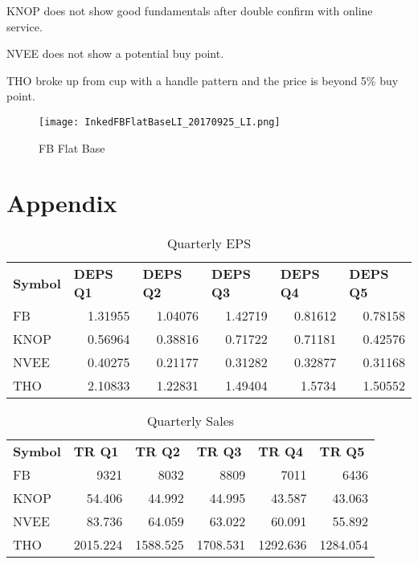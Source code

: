 \documentclass{article}
\begin{document}
KNOP does not show good fundamentals after double confirm with online service.

NVEE does not show a potential buy point. 

THO broke up from cup with a handle pattern and the price is beyond 5\% buy point.

\begin{figure}[h]
\centering
\texttt{[image: InkedFBFlatBaseLI\_20170925\_LI.png]}
\caption{FB Flat Base}
\label{fig:FBFlatBase}
\end{figure}

\section{Appendix}
\begin{table}[htbp]
  \caption{Quarterly EPS}
    \begin{tabular}{lrrrrr}
    \textbf{Symbol} & \multicolumn{1}{l}{\textbf{DEPS Q1}} & \multicolumn{1}{l}{\textbf{DEPS Q2}} & \multicolumn{1}{l}{\textbf{DEPS Q3}} & \multicolumn{1}{l}{\textbf{DEPS Q4}} & \multicolumn{1}{l}{\textbf{DEPS Q5}} \\
    FB    & 1.31955 & 1.04076 & 1.42719 & 0.81612 & 0.78158 \\
    KNOP  & 0.56964 & 0.38816 & 0.71722 & 0.71181 & 0.42576 \\
    NVEE  & 0.40275 & 0.21177 & 0.31282 & 0.32877 & 0.31168 \\
    THO   & 2.10833 & 1.22831 & 1.49404 & 1.5734 & 1.50552 \\
    \end{tabular}%
  \label{tab:addlabel}%
\end{table}%

\begin{table}[htbp]
  \caption{Quarterly Sales}
    \begin{tabular}{lrrrrr}
    \textbf{Symbol} & \multicolumn{1}{l}{\textbf{TR Q1}} & \multicolumn{1}{l}{\textbf{TR Q2}} & \multicolumn{1}{l}{\textbf{TR Q3}} & \multicolumn{1}{l}{\textbf{TR Q4}} & \multicolumn{1}{l}{\textbf{TR Q5}} \\
    FB    & 9321  & 8032  & 8809  & 7011  & 6436 \\
    KNOP  & 54.406 & 44.992 & 44.995 & 43.587 & 43.063 \\
    NVEE  & 83.736 & 64.059 & 63.022 & 60.091 & 55.892 \\
    THO   & 2015.224 & 1588.525 & 1708.531 & 1292.636 & 1284.054 \\
    \end{tabular}%
  \label{tab:addlabel}%
\end{table}%
\end{document}
